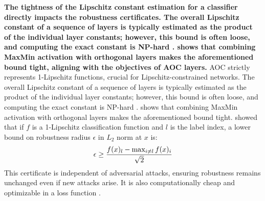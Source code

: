 \textbf{The tightness of the Lipschitz constant estimation for a classifier directly impacts the robustness certificates. The overall Lipschitz constant of a sequence of layers is typically estimated as the product of the individual layer constants; however, this bound is often loose, and computing the exact constant is NP-hard \cite{virmaux2018lipschitz}. \citep{anil_sorting_2019} shows that combining MaxMin activation with orthogonal layers makes the aforementioned bound tight, aligning with the objectives of AOC layers.
}
\fi
AOC strictly represents 1-Lipschitz functions, crucial for Lipschitz-constrained networks.
The overall Lipschitz constant of a sequence of layers is typically estimated as the product of the individual layer constants; however, this bound is often loose, and computing the exact constant is NP-hard \cite{virmaux2018lipschitz}. \citep{anil_sorting_2019} 
shows that combining MaxMin activation with orthogonal layers makes the aforementioned bound tight. \cite{bartlett2017spectrally} showed that if $f$ is a 1-Lipschitz classification function and $l$ is the label index, a lower bound on robustness radius $ \epsilon$ in $L_2$ norm at $x$ is:
\vspace{-1.5mm}
\[
    \epsilon \geq \frac{f(x)_l - \max_{i \neq l}f(x)_i}{\sqrt{2}}
    \vspace{-2mm}
\]
This certificate is independent of adversarial attacks, ensuring robustness remains unchanged even if new attacks arise. It is also computationally cheap and optimizable in a loss function \cite{singla_improved_2022, hu_recipe_2023}.

